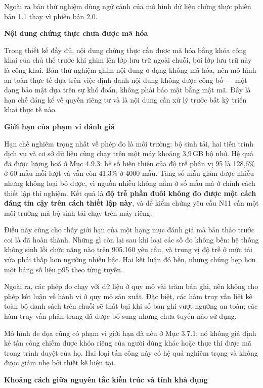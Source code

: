 Ngoài ra bản thử nghiệm dùng ngữ cảnh của mô hình dữ liệu chứng thực phiên bản 1.1 thay vì phiên bản 2.0.

\noindent \textbf{Nội dung chứng thực chưa được mã hóa}

Trong thiết kế đầy đủ, nội dung chứng thực cần được mã hóa bằng khóa công khai của chủ thể trước khi ghim lên lớp lưu trữ ngoài chuỗi, bởi lớp lưu trữ này là công khai. Bản thử nghiệm ghim nội dung ở dạng không mã hóa, nên mô hình an toàn thực tế dựa trên việc định danh nội dung không được công bố --- một dạng bảo mật dựa trên sự khó đoán, không phải bảo mật bằng mật mã. Đây là hạn chế đáng kể về quyền riêng tư và là nội dung cần xử lý trước bất kỳ triển khai thực tế nào.

\noindent \textbf{Giới hạn của phạm vi đánh giá}

Hạn chế nghiêm trọng nhất về phép đo là môi trường: bộ sinh tải, hai tiến trình dịch vụ và cơ sở dữ liệu cùng chạy trên một máy khoảng 3,9\,GB bộ nhớ. Hệ quả đã được lượng hoá ở Mục 4.9.3: hệ số biến thiên của độ trễ phân vị 95 là 128,6\% ở 60 mẫu mỗi lượt và vẫn còn 41,3\% ở 4000 mẫu. Tăng số mẫu giảm được nhiễu nhưng không loại bỏ được, vì nguồn nhiễu không nằm ở số mẫu mà ở chính cách thiết lập thí nghiệm. Kết quả là \textbf{độ trễ phần đuôi không đo được một cách đáng tin cậy trên cách thiết lập này}, và để kiểm chứng yêu cầu N11 cần một môi trường mà bộ sinh tải chạy trên máy riêng.

Điều này cũng cho thấy giới hạn của một hạng mục đánh giá mà bản thảo trước coi là đã hoàn thành. Những gì còn lại sau khi loại các số đo không bền: hệ thống không sinh lỗi chức năng nào trên 905.160 yêu cầu, và trung vị độ trễ ở mức tải vừa phải thấp hơn ngưỡng nhiều bậc. Hai kết luận đó bền, nhưng chúng hẹp hơn một bảng số liệu p95 theo từng tuyến.

Ngoài ra, các phép đo chạy với dữ liệu ở quy mô vài trăm bản ghi, nên không cho phép kết luận về hành vi ở quy mô sản xuất. Đặc biệt, các hàm truy vấn liệt kê toàn bộ danh sách trên chuỗi sẽ thất bại khi số bản ghi vượt ngưỡng an toàn; các hàm truy vấn phân trang đã được bổ sung nhưng chưa tuyến nào sử dụng.

Mô hình đe dọa cũng có phạm vi giới hạn đã nêu ở Mục 3.7.1: nó không giả định kẻ tấn công chiếm được khóa riêng của người dùng khác hoặc thực thi được mã trong trình duyệt của họ. Hai loại tấn công này có hệ quả nghiêm trọng và không được giảm nhẹ bởi thiết kế hiện tại.

\noindent \textbf{Khoảng cách giữa nguyên tắc kiến trúc và tính khả dụng}

